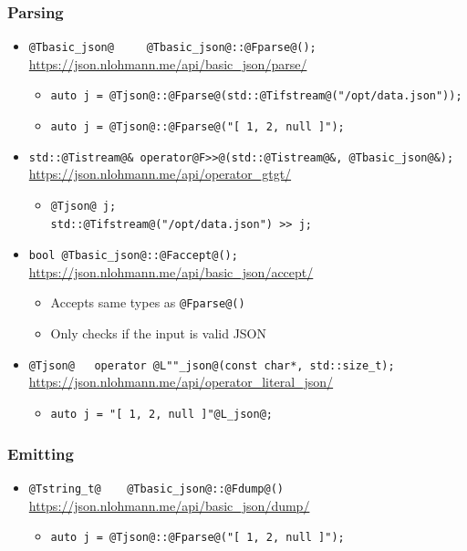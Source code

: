 \begin{frame}[fragile]\frametitle{Parsing}
  \begin{itemize}
    \item \lstinline{@Tbasic_json@     @Tbasic_json@::@Fparse@();} \\
      {\scriptsize\url{https://json.nlohmann.me/api/basic_json/parse/}}
      \begin{itemize}
        \item \lstinline{auto j = @Tjson@::@Fparse@(std::@Tifstream@("/opt/data.json"));}
        \item \lstinline{auto j = @Tjson@::@Fparse@("[ 1, 2, null ]");}
      \end{itemize}
    \item \lstinline{std::@Tistream@& operator@F>>@(std::@Tistream@&, @Tbasic_json@&);} \\
      {\scriptsize\url{https://json.nlohmann.me/api/operator_gtgt/}}
      \vspace{-6pt}
      \begin{itemize}
        \item \begin{lstlisting}
@Tjson@ j;
std::@Tifstream@("/opt/data.json") >> j;
        \end{lstlisting}
      \end{itemize}
      \vspace{-8pt}
    \item \lstinline{bool @Tbasic_json@::@Faccept@();} \\
      {\scriptsize\url{https://json.nlohmann.me/api/basic_json/accept/}}
      \begin{itemize}
        \item Accepts same types as \lstinline{@Fparse@()}
        \item Only checks if the input is valid JSON
      \end{itemize}
    \item \lstinline{@Tjson@   operator @L""_json@(const char*, std::size_t);} \\
      {\scriptsize\url{https://json.nlohmann.me/api/operator_literal_json/}}
      \begin{itemize}
        \item \lstinline{auto j = "[ 1, 2, null ]"@L_json@;}
      \end{itemize}
  \end{itemize}
\end{frame}

\begin{frame}[fragile]\frametitle{Emitting}
  \begin{itemize}
    \item \lstinline{@Tstring_t@    @Tbasic_json@::@Fdump@()} \\
      {\scriptsize\url{https://json.nlohmann.me/api/basic_json/dump/}}
      \begin{itemize}
        \item \lstinline{auto j = @Tjson@::@Fparse@("[ 1, 2, null ]");}
      \end{itemize}
  \end{itemize}
\end{frame}

